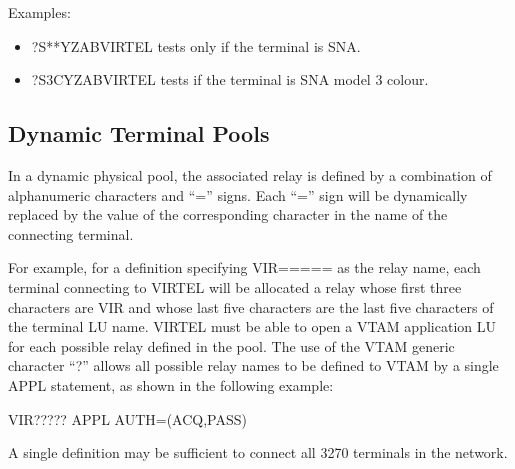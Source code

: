 \documentclass[letterpaper,10pt,english]{sphinxmanual}
\begin{document}
\sphinxAtStartPar
Examples:
\begin{itemize}
\item {} 
\sphinxAtStartPar
?S**YZABVIRTEL tests only if the terminal is SNA.

\item {} 
\sphinxAtStartPar
?S3CYZABVIRTEL tests if the terminal is SNA model 3 colour.

\end{itemize}

\ignorespaces 

\subsection{Dynamic Terminal Pools}
\label{\detokenize{connectivity_guide:dynamic-terminal-pools}}\label{\detokenize{connectivity_guide:index-143}}
\sphinxAtStartPar
In a dynamic physical pool, the associated relay is defined by a combination of alphanumeric characters and “=” signs. Each “=” sign will be dynamically replaced by the value of the corresponding character in the name of the connecting
terminal.

\sphinxAtStartPar
For example, for a definition specifying VIR===== as the relay name, each terminal connecting to VIRTEL will be allocated a relay whose first three characters are VIR and whose last five characters are the last five characters of the terminal LU name. VIRTEL must be able to open a VTAM application LU for each possible relay defined in the pool. The use of the VTAM generic character “?” allows all possible relay names to be defined to VTAM by a single APPL statement, as shown in the following example:

\begin{sphinxVerbatim}[commandchars=\\\{\}]
VIR????? APPL AUTH=(ACQ,PASS)
\end{sphinxVerbatim}

\sphinxAtStartPar
A single definition may be sufficient to connect all 3270 terminals in the network.

\ignorespaces 
\end{document}
